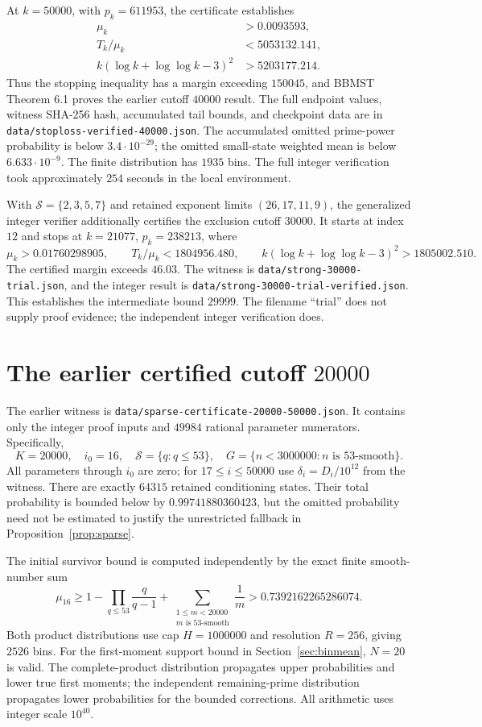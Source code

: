 \documentclass[11pt]{article}
\begin{document}
At $k=50000$, with $p_k=611953$, the certificate establishes
\begin{align*}
 \mu_k&>0.0093593,\\
 T_k/\mu_k&<5053132.141,\\
 k(\log k+\log\log k-3)^2&>5203177.214.
\end{align*}
Thus the stopping inequality has a margin exceeding $150045$, and
BBMST Theorem 6.1 proves the earlier cutoff $40000$ result.
The full endpoint values, witness SHA-256 hash, accumulated tail bounds,
and checkpoint data are in \texttt{data/stoploss-verified-40000.json}.
The accumulated omitted prime-power probability is below $3.4\cdot10^{-29}$;
the omitted small-state weighted mean is below $6.633\cdot10^{-9}$.
The finite distribution has $1935$ bins. The full integer verification took
approximately $254$ seconds in the local environment.

With $\mathcal S=\{2,3,5,7\}$ and retained exponent limits
$(26,17,11,9)$, the generalized integer verifier additionally certifies
the exclusion cutoff $30000$. It starts at index $12$ and stops at
$k=21077$, $p_k=238213$, where
\[
 \mu_k>0.01760298905,\qquad T_k/\mu_k<1804956.480,
 \qquad k(\log k+\log\log k-3)^2>1805002.510.
\]
The certified margin exceeds $46.03$. The witness is
\texttt{data/strong-30000-trial.json}, and the integer result is
\texttt{data/strong-30000-trial-verified.json}. This establishes the
intermediate bound $29999$. The filename ``trial'' does not supply proof
evidence; the independent integer verification does.

\section{The earlier certified cutoff $20000$}\label{sec:earlier20}
The earlier witness is
\texttt{data/sparse-certificate-20000-50000.json}. It contains only the
integer proof inputs and $49984$ rational parameter numerators. Specifically,
\[
 K=20000,\quad i_0=16,\quad \mathcal S=\{q:q\leq53\},\quad
 G=\{n<3000000:n\text{ is }53\text{-smooth}\}.
\]
All parameters through $i_0$ are zero; for $17\leq i\leq50000$ use
$\delta_i=D_i/10^{12}$ from the witness. There are exactly $64315$
retained conditioning states. Their total probability is bounded below by
$0.99741880360423$, but the omitted probability need not be estimated to
justify the unrestricted fallback in Proposition~\ref{prop:sparse}.

The initial survivor bound is computed independently by the exact finite
smooth-number sum
\[
 \mu_{16}\geq1-\prod_{q\leq53}\frac q{q-1}
 +\sum_{\substack{1\leq m<20000\\m\text{ is }53\text{-smooth}}}\frac1m
 >0.7392162265286074.
\]
Both product distributions use cap $H=1000000$ and resolution $R=256$,
giving $2526$ bins. For the first-moment support bound in
Section~\ref{sec:binmean}, $N=20$ is valid. The complete-product
distribution propagates upper probabilities and lower true first moments;
the independent remaining-prime distribution propagates lower probabilities
for the bounded corrections. All arithmetic uses integer scale $10^{40}$.
\end{document}
